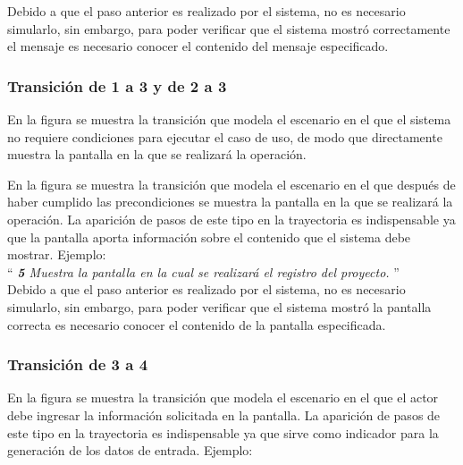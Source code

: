	Debido a que el paso anterior es realizado por el sistema, no es necesario simularlo, sin embargo, para poder verificar que el sistema mostró correctamente el mensaje es necesario conocer el contenido del mensaje especificado. 
		
\subsubsection{Transición de 1 a 3 y de 2 a 3}

  
En la figura  se muestra la transición que modela el escenario en el que el sistema no requiere condiciones para ejecutar el caso de uso, de modo que directamente muestra la pantalla en la que se realizará la operación.
  
 En la figura  se muestra la transición que modela el escenario en el que después de haber cumplido las precondiciones se muestra la pantalla en la que se realizará la operación.
 La aparición de pasos de este tipo en la trayectoria es indispensable ya que la pantalla aporta información sobre el contenido que el sistema debe mostrar. Ejemplo:\\
   
  ``{\it
    {\bf 5} \UCsist Muestra la pantalla  en la cual se realizará el registro del proyecto. 
   } ''\\
	
  	Debido a que el paso anterior es realizado por el sistema, no es necesario simularlo, sin embargo, para poder verificar que el sistema mostró la pantalla correcta es necesario conocer el contenido de la pantalla especificada. 
	
\subsubsection{Transición de 3 a 4}


En la figura  se muestra la transición que modela el escenario en el que el actor debe ingresar la información solicitada en la pantalla.
 La aparición de pasos de este tipo en la trayectoria es indispensable ya que sirve como indicador para la generación de los datos de entrada. Ejemplo:\\
   

